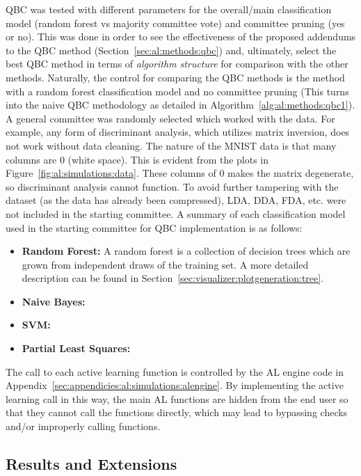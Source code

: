 \noindent QBC was tested with different parameters for the overall/main 
classification model (random forest vs majority committee vote) and committee 
pruning (yes or no). This was done in order to see the effectiveness of the 
proposed addendums to the QBC method (Section~\ref{sec:al:methods:qbc}) and, 
ultimately, select the best QBC method in terms of \textit{algorithm structure} 
for comparison with the other methods. Naturally, the control for comparing the 
QBC methods is the method with a random forest classification model and no 
committee pruning (This turns into the naive QBC methodology as detailed in 
Algorithm~\ref{alg:al:methods:qbc1}). A general committee was randomly selected 
which worked with the data. For example, any form of discriminant analysis, 
which utilizes matrix inversion, does not work without data cleaning. The 
nature of the MNIST data is that many columns are 0 (white space). This is 
evident from the plots in Figure~\ref{fig:al:simulations:data}. These columns 
of 0 makes the matrix degenerate, so discriminant analysis cannot function. 
To avoid further tampering with the dataset (as the data has already been 
compressed), LDA, DDA, FDA, etc. were not included in the starting committee. 
A summary of each classification model used in the starting committee for QBC 
implementation is as follows:

\tablespacing
\begin{itemize}
	\item \textbf{Random Forest:} A random forest is a collection of decision 
	trees which are grown from independent draws of the training set. A more 
	detailed description can be found in 
	Section~\ref{sec:visualizer:plotgeneration:tree}.
	\item \textbf{Naive Bayes:}
	\item \textbf{SVM:}
	\item \textbf{Partial Least Squares:}
\end{itemize}
\bodyspacing

The call to each active learning function is controlled by the AL engine code 
in Appendix~\ref{sec:appendicies:al:simulations:alengine}. By implementing the 
active learning call in this way, the main AL functions are hidden from the end 
user so that they cannot call the functions directly, which may lead to 
bypassing checks and/or improperly calling functions.



\subsection{Results and Extensions}
\label{sec:al:simulation:results}

